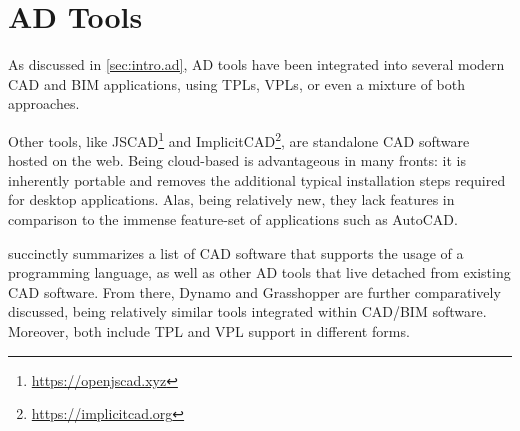 \section{\acl{AD} Tools}%
\label{sec:related.ad}

As discussed in \cref{sec:intro.ad}, \ac{AD} tools have been integrated into
several modern \ac{CAD} and \ac{BIM} applications, using \acp{TPL}, \acp{VPL},
or even a mixture of both approaches.

Other tools, like JSCAD\footnote{\url{https://openjscad.xyz}} and
ImplicitCAD\footnote{\url{https://implicitcad.org}}, are standalone \ac{CAD}
software hosted on the web.  Being cloud-based is advantageous in many fronts:
it is inherently portable and removes the additional typical installation steps
required for desktop applications.  Alas, being relatively new, they lack
features in comparison to the immense feature-set of applications such as
AutoCAD\@.

 succinctly summarizes a list of \ac{CAD} software
that supports the usage of a programming language, as well as other \ac{AD}
tools that live detached from existing \ac{CAD} software.  From there, Dynamo
and Grasshopper are further comparatively discussed, being relatively similar
tools integrated within \acs{CAD}/\acs{BIM} software.  Moreover, both include
\ac{TPL} and \ac{VPL} support in different forms.

